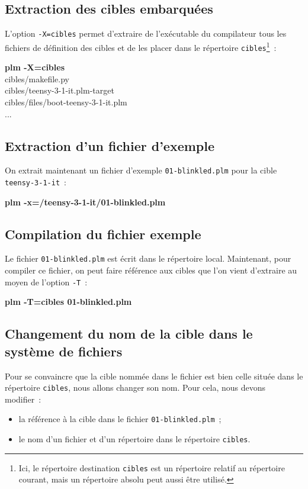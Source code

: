 \subsection{Extraction des cibles embarquées}
L'option \texttt{-X=cibles} permet d'extraire de l'exécutable du compilateur tous les fichiers de définition des cibles et de les placer dans le répertoire \texttt{cibles}\footnote{Ici, le répertoire destination \texttt{cibles} est un répertoire relatif au répertoire courant, mais un répertoire absolu peut aussi être utilisé.}~:
\begin{SHELL}
{\bfseries plm -X=cibles}\\
\hspace*{1.2em}cibles/makefile.py\\
\hspace*{1.2em}cibles/teensy-3-1-it.plm-target\\
\hspace*{1.2em}cibles/files/boot-teensy-3-1-it.plm\\
\hspace*{1.2em}...
\end{SHELL}

\subsection{Extraction d'un fichier d'exemple}
On extrait maintenant un fichier d'exemple \texttt{01-blinkled.plm} pour la cible \texttt{teensy-3-1-it}~:
\begin{SHELL}
\bfseries plm -x=/teensy-3-1-it/01-blinkled.plm
\end{SHELL}

\subsection{Compilation du fichier exemple}
Le fichier \texttt{01-blinkled.plm} est écrit dans le répertoire local. Maintenant, pour compiler ce fichier, on peut faire référence aux cibles que l'on vient d'extraire au moyen de l'option \texttt{-T}~:
\begin{SHELL}
\bfseries plm -T=cibles 01-blinkled.plm
\end{SHELL}


\subsection{Changement du nom de la cible dans le système de fichiers}

Pour se convaincre que la cible nommée dans le fichier est bien celle située dans le répertoire \texttt{cibles}, nous allons changer son nom. Pour cela, nous devons modifier~:
\begin{itemize}
  \item la référence à la cible dans le fichier \texttt{01-blinkled.plm}~;
  \item le nom d'un fichier et d'un répertoire dans le répertoire \texttt{cibles}. 
\end{itemize}

